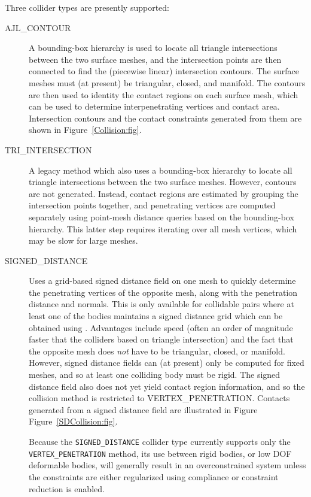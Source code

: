 Three collider types are presently supported:

\begin{description}

\item[AJL\_CONTOUR]\mbox{}

A bounding-box hierarchy is used to locate all triangle intersections
between the two surface meshes, and the intersection points are then
connected to find the (piecewise linear) intersection contours.  The
surface meshes must (at present) be triangular, closed, and manifold.
The contours are then used to identity the contact regions
on each surface mesh, which can be used to determine interpenetrating
vertices and contact area. Intersection contours and the contact
constraints generated from them are shown in Figure~\ref{Collision:fig}.

\item[TRI\_INTERSECTION]\mbox{}

A legacy method which also uses a bounding-box hierarchy to locate all
triangle intersections between the two surface meshes. However,
contours are not generated. Instead, contact regions are estimated by
grouping the intersection points together, and penetrating vertices
are computed separately using point-mesh distance queries based on the
bounding-box hierarchy. This latter step requires iterating over all
mesh vertices, which may be slow for large meshes.

\item[SIGNED\_DISTANCE]\mbox{}

Uses a grid-based signed distance field on one mesh to quickly
determine the penetrating vertices of the opposite mesh, along with
the penetration distance and normals.  This is only available for
collidable pairs where at least one of the bodies maintains a signed
distance grid which can be obtained using
.
Advantages include speed (often
an order of magnitude faster that the colliders based on triangle
intersection) and the fact that the opposite mesh does {\it not} have
to be triangular, closed, or manifold.  However, signed distance
fields can (at present) only be computed for fixed meshes, and so at
least one colliding body must be rigid.  The signed distance field
also does not yet yield contact region information, and so the collision
method is restricted to
%
{VERTEX\_PENETRATION}.
Contacts generated from a signed distance field are illustrated in
Figure Figure~\ref{SDCollision:fig}.

\begin{sideblock}
Because the {\tt SIGNED\_DISTANCE} collider type currently supports
only the {\tt VERTEX\_PENETRATION} method, its use between rigid
bodies, or low DOF deformable bodies, will generally result in an
overconstrained system unless the constraints are either regularized
using compliance or constraint reduction is enabled.
\end{sideblock}

\end{description}

